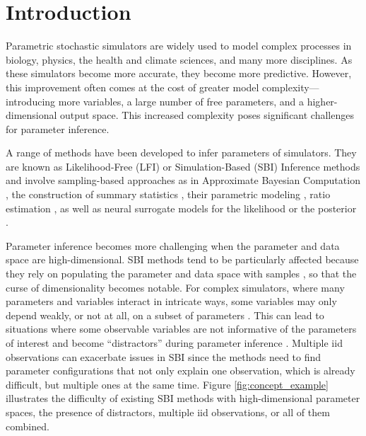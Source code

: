 \documentclass[twoside]{article}
\begin{document}
\section{Introduction}

Parametric stochastic simulators are widely used to model complex processes in biology, physics, the health and climate sciences, and many more disciplines. As these simulators become more accurate, they become more predictive. However, this improvement often comes at the cost of 
greater model complexity---introducing more variables, a large number of free parameters, and a higher-dimensional output space. This increased complexity poses significant challenges for parameter inference.

A range of methods have been developed to infer parameters of simulators. They are known as Likelihood-Free (LFI) or Simulation-Based (SBI) Inference methods \citep{lintusaari2017fundamentals, sisson2018handbook, cranmer2020frontier} and involve sampling-based approaches as in Approximate Bayesian Computation \citep[ABC,][]{Marin2012}, the construction of summary statistics \citep{Chen2021a, Chen2023}, their parametric modeling \citep{wood2010statistical, price2018bayesian}, ratio estimation \citep{thomas2022likelihood, durkan2020contrastive}, as well as neural surrogate models for the likelihood \citep[NLE,][]{papamakarios2019sequential} or the posterior \citep[NPE,][]{greenberg2019automatic, papamakarios2016fast}.

Parameter inference becomes more challenging when the parameter and data space are high-dimensional. SBI methods tend to be particularly affected because they rely on populating the parameter and data space with samples \citep{lintusaari2017fundamentals, sisson2018handbook, cranmer2020frontier}, so that the curse of dimensionality becomes notable. For complex simulators, where many parameters and variables interact in intricate ways, some variables may only depend weakly, or not at all, on a subset of parameters \citep{Saltelli2008, MonsalveBravo2022}. This can lead to situations where some observable variables are not informative of the parameters of interest and become ``distractors'' during parameter inference \citep{lueckmann2021benchmarking}. Multiple iid observations can exacerbate issues in SBI since the methods need to find parameter configurations that not only explain one observation, which is already difficult, but multiple ones at the same time. Figure \ref{fig:concept_example} illustrates the difficulty of existing SBI methods with high-dimensional parameter spaces, the presence of distractors, multiple iid observations, or all of them combined.
\end{document}
